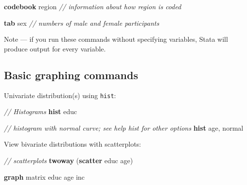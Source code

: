 \documentclass[
]{book}
\newenvironment{Shaded}{\begin{snugshade}}{\end{snugshade}}
\newcommand{\CommentTok}[1]{\textcolor[rgb]{0.56,0.35,0.01}{\textit{#1}}}
\newcommand{\FunctionTok}[1]{\textcolor[rgb]{0.00,0.00,0.00}{#1}}
\newcommand{\KeywordTok}[1]{\textcolor[rgb]{0.13,0.29,0.53}{\textbf{#1}}}
\newcommand{\NormalTok}[1]{#1}
\begin{document}
\begin{Shaded}
\begin{Highlighting}[]
\KeywordTok{codebook}\NormalTok{ region }\CommentTok{// information about how region is coded}
\end{Highlighting}
\end{Shaded}

\begin{Shaded}
\begin{Highlighting}[]
\KeywordTok{tab}\NormalTok{ sex }\CommentTok{// numbers of male and female participants}
\end{Highlighting}
\end{Shaded}

Note --- if you run these commands without specifying variables, Stata will produce output for every variable.

\hypertarget{basic-graphing-commands}{%
\subsection{Basic graphing commands}\label{basic-graphing-commands}}

Univariate distribution(s) using \texttt{hist}:

\begin{Shaded}
\begin{Highlighting}[]
\CommentTok{// Histograms }
\KeywordTok{hist}\NormalTok{ educ}
\end{Highlighting}
\end{Shaded}

\begin{Shaded}
\begin{Highlighting}[]
\CommentTok{// histogram with normal curve; see \textasciigrave{}help hist\textasciigrave{} for other options}
\KeywordTok{hist}\NormalTok{ age, }\FunctionTok{normal}  
\end{Highlighting}
\end{Shaded}

View bivariate distributions with scatterplots:

\begin{Shaded}
\begin{Highlighting}[]
\CommentTok{// scatterplots }
\KeywordTok{twoway}\NormalTok{ (}\KeywordTok{scatter}\NormalTok{ educ age)}
\end{Highlighting}
\end{Shaded}

\begin{Shaded}
\begin{Highlighting}[]
\KeywordTok{graph} \FunctionTok{matrix}\NormalTok{ educ age inc}
\end{Highlighting}
\end{Shaded}
\end{document}
